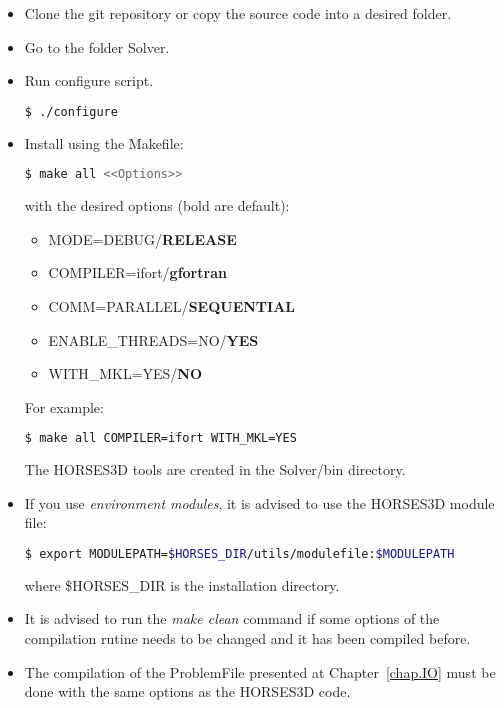 \documentclass[a4paper,10pt]{report}
\begin{document}
\begin{itemize}
\item Clone the git repository or copy the source code into a desired folder.

\item Go to the folder Solver.

\item Run configure script.
\begin{lstlisting}[language=bash]
	$ ./configure
\end{lstlisting}
\item Install using the Makefile:
\begin{lstlisting}[language=bash]
	$ make all <<Options>>
\end{lstlisting}
with the desired options (bold are default):

\begin{itemize}
\item MODE=DEBUG/\textbf{RELEASE}
\item COMPILER=ifort/\textbf{gfortran}
\item COMM=PARALLEL/\textbf{SEQUENTIAL}
\item ENABLE\_THREADS=NO/\textbf{YES}
\item WITH\_MKL=YES/\textbf{NO}
\end{itemize}

For example:
\begin{lstlisting}[language=bash]
	$ make all COMPILER=ifort WITH_MKL=YES
\end{lstlisting}

The HORSES3D tools are created in the Solver/bin directory.

\item If you use \textit{environment modules}, it is advised to use the HORSES3D module file:\\
\begin{lstlisting}[language=bash]
	$ export MODULEPATH=$HORSES_DIR/utils/modulefile:$MODULEPATH
\end{lstlisting}
where \$HORSES\_DIR is the installation directory.

\item It is advised to run the \emph{make clean} command if some options of the compilation rutine needs to be changed and it has been compiled before.

\item The compilation of the ProblemFile presented at Chapter~\ref{chap.IO} must be done with the same options as the HORSES3D code.
\end{itemize}
\end{document}
